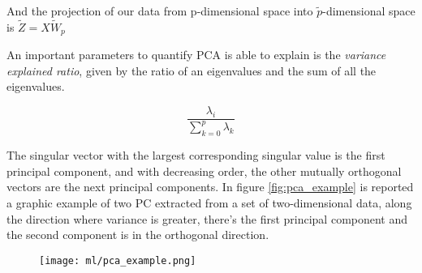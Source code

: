 \documentclass[a4paper,11pt]{article}
\begin{document}
And the projection of our data from p-dimensional space into $\tilde p$-dimensional space is $\tilde Z = X\tilde W_p$

An important parameters to quantify  PCA is able to explain is the \emph{variance explained ratio}, given by the ratio of an eigenvalues and the sum of all the eigenvalues.

\begin{equation}
\frac{\lambda_i}{\sum_{k = 0}^p \lambda_k}
\end{equation}

The singular vector with the largest corresponding singular value is the first principal component, and with decreasing order, the other mutually orthogonal vectors are the next principal components.
In figure \ref{fig:pca_example} is reported a graphic example of two PC extracted from a set of two-dimensional data, along the direction where variance is greater, there's the first principal component and the second component is in the orthogonal direction.

\begin{figure}[h]
\centering
\texttt{[image: ml/pca\_example.png]}
\caption{}
\label{}
\end{figure}



\end{document}
